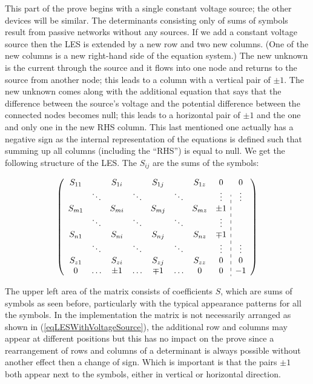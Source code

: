 This part of the prove begins with a single constant voltage source; the
other devices will be similar. The determinants consisting only of sums of
symbols result from passive networks without any sources. If we add a
constant voltage source then the LES is extended by a new row and two new
columns. (One of the new columns is a new right-hand side of the equation
system.) The new unknown is the current through the source and it flows
into one node and returns to the source from another node; this leads to a
column with a vertical pair of $\pm 1$. The new unknown comes along with
the additional equation that says that the difference between the source's
voltage and the potential difference between the connected nodes becomes
null; this leads to a horizontal pair of $\pm 1$ and the one and only one
in the new RHS column. This last mentioned one actually has a negative
sign as the internal representation of the equations is defined such that
summing up all columns (including the ``RHS'') is equal to null. We get
the following structure of the LES. The $S_{ij}$ are the sums of the
symbols:

\begin{equation}
\label{eqLESWithVoltageSource}
\left(
\begin{array}{cccccccc:c}
 S_{11}  &        &  S_{1i}  &        &  S_{1j}  &        &  S_{1z}  & 0       & 0      \\
         & \ddots &          & \ddots &          & \ddots &          & \vdots  & \vdots \\
 S_{m1}  &        &  S_{mi}  &        &  S_{mj}  &        &  S_{mz}  &  \pm 1  &        \\
         & \ddots &          & \ddots &          & \ddots &          & \vdots  &        \\
 S_{n1}  &        &  S_{ni}  &        &  S_{nj}  &        &  S_{nz}  &  \mp 1  &        \\
         & \ddots &          & \ddots &          & \ddots &          & \vdots  & \vdots \\
 S_{z1}  &        &  S_{zi}  &        &  S_{zj}  &        &  S_{zz}  & 0       & 0      \\
0        & \ldots &  \pm 1   & \ldots &  \mp 1   & \ldots &        0 & 0       & -1     \\
\end{array}
\right)
\end{equation}

The upper left area of the matrix consists of coefficients $S$, which are
sums of symbols as seen before, particularly with the typical appearance
patterns for all the symbols. In the implementation the matrix is not
necessarily arranged as shown in (\ref{eqLESWithVoltageSource}), the
additional row and columns may appear at different positions but this has
no impact on the prove since a rearrangement of rows and columns of a
determinant is always possible without another effect then a change of
sign. Which is important is that the pairs $\pm 1$ both appear next to the
symbols, either in vertical or horizontal direction.

